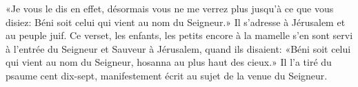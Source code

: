 «Je vous le dis en effet,
	désormais vous ne me verrez plus jusqu'à ce que vous disiez:
	Béni soit celui qui vient au nom du Seigneur.»
Il s'adresse à Jérusalem et au peuple juif.
Ce verset, les enfants, les petits encore à la mamelle
		s'en sont servi à l'entrée du Seigneur et Sauveur à Jérusalem,
	quand ils disaient: «Béni soit celui qui vient au nom du Seigneur,
	hosanna au plus haut des cieux.»
Il l'a tiré du psaume cent dix-sept,
		manifestement écrit au sujet de la venue du Seigneur.
